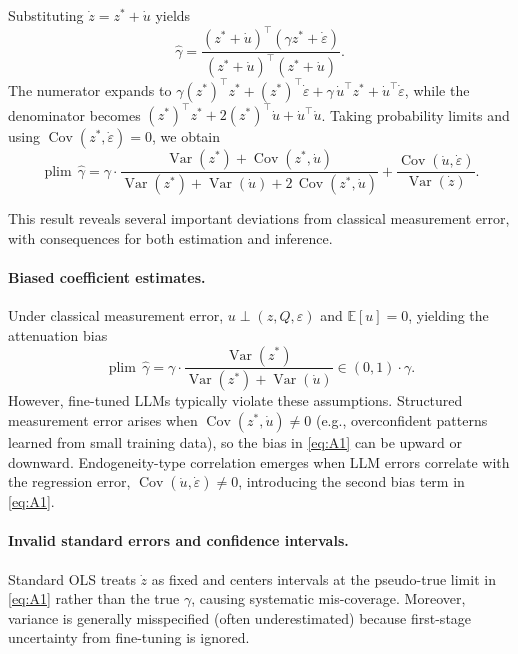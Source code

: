 \documentclass[11pt]{article}
\begin{document}
Substituting $\dot z = z^\ast + \dot u$ yields
\begin{equation}
\hat\gamma = \frac{(z^\ast + \dot u)^\top(\gamma z^\ast + \dot\varepsilon)}{(z^\ast + \dot u)^\top(z^\ast + \dot u)}.
\end{equation}
The numerator expands to $\gamma (z^\ast)^\top z^\ast + (z^\ast)^\top \dot\varepsilon + \gamma\, \dot u^\top z^\ast + \dot u^\top \dot\varepsilon$, while the denominator becomes $(z^\ast)^\top z^\ast + 2(z^\ast)^\top \dot u + \dot u^\top \dot u$.
Taking probability limits and using $\operatorname{Cov}(z^\ast,\dot\varepsilon)=0$, we obtain
\begin{equation}
\operatorname{plim}\,\hat\gamma = \gamma \cdot
\frac{\operatorname{Var}(z^\ast) + \operatorname{Cov}(z^\ast,\dot u)}
{\operatorname{Var}(z^\ast) + \operatorname{Var}(\dot u) + 2\,\operatorname{Cov}(z^\ast,\dot u)}
+
\frac{\operatorname{Cov}(\dot u,\dot\varepsilon)}{\operatorname{Var}(\dot z)}.
\tag{A1}\label{eq:A1}
\end{equation}

This result reveals several important deviations from classical measurement error, with consequences for both estimation and inference.

\paragraph{Biased coefficient estimates.}
Under classical measurement error, $u \perp (z,Q,\varepsilon)$ and $\mathbb{E}[u]=0$, yielding the attenuation bias
\begin{equation}
\operatorname{plim}\,\hat\gamma
=
\gamma \cdot \frac{\operatorname{Var}(z^\ast)}{\operatorname{Var}(z^\ast) + \operatorname{Var}(\dot u)}
\in (0,1)\cdot \gamma.
\tag{A2}
\end{equation}
However, fine-tuned LLMs typically violate these assumptions.
Structured measurement error arises when $\operatorname{Cov}(z^\ast,\dot u)\neq 0$ (e.g., overconfident patterns learned from small training data), so the bias in \eqref{eq:A1} can be upward or downward.
Endogeneity-type correlation emerges when LLM errors correlate with the regression error, $\operatorname{Cov}(\dot u,\dot\varepsilon)\neq 0$, introducing the second bias term in \eqref{eq:A1}.

\paragraph{Invalid standard errors and confidence intervals.}
Standard OLS treats $\dot z$ as fixed and centers intervals at the pseudo-true limit in \eqref{eq:A1} rather than the true $\gamma$, causing systematic mis-coverage.
Moreover, variance is generally misspecified (often underestimated) because first-stage uncertainty from fine-tuning is ignored.
\end{document}
